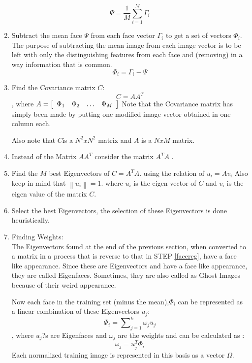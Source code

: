 \documentclass[a4paper,twoside]{article}
\begin{document}
\begin{enumerate}
\begin{equation}
\Psi  = \frac{1}{M}\sum\limits_{i = 1}^M {\Gamma _i }
\end{equation}
\item  Subtract the mean face $\Psi$ from each face vector $\Gamma_i$ to get a set of vectors $\Phi_i$. The purpose of subtracting the mean image from each image vector is to be left with only the distinguishing features from each face and (removing)  in a way information that is common.
\begin{equation}
\Phi _i  = \Gamma_i  - \Psi
\end{equation}
\item  Find the Covariance matrix $C$:
\begin{equation}
C = AA^T
\end{equation} , where $A = \left[ {\begin{array}{*{20}c}
   {\Phi _1 } & {\Phi_2} & {\dots} & {\Phi _M }  \\
\end{array}} \right]
$
Note that the Covariance matrix has simply been made by putting one modified image vector obtained in  one column each.

Also note that $C$is a $N^2xN^2$ matrix and $A$ is a $NxM$ matrix.


\item  Instead of the Matrix $AA^T$  consider the matrix $A^TA$ .


\item Find the $M$ best  Eigenvectors of $C=A^TA$. using the relation of $u_i=Av_i$  Also keep in mind that $\left\| {u_i} \right\| = 1.$ where  $u_i$ is the eigen vector of $C$ and $v_i$ is the eigen value of the matrix $C$.



\item Select the best  Eigenvectors, the selection of these Eigenvectors is done heuristically.






\item Finding Weights:\\

The Eigenvectors found at the end of the previous section,  when converted to a matrix in a process that is reverse to that in STEP \ref{facereg}, have a face like appearance. Since these are Eigenvectors and have a face like appearance, they are called Eigenfaces. Sometimes, they are also called as Ghost Images because of their weird appearance.

Now each face in the training set (minus the mean),$\Phi_i$  can be represented as a linear combination of these Eigenvectors   $u_j$:
  \begin{equation}
\Phi_i  = \sum\nolimits_{j = 1}^k {\omega_j u_j}
  \end{equation}
, where  $u_j$?s are Eigenfaces and $\omega_j$ are the weights and can be calculated as :
\begin{equation}
\label{weighteq}
\omega _j  = u_j^T \Phi _i
\end{equation}
Each normalized training image is represented in this basis as a vector $\Omega$.
\end{enumerate}
\end{document}
